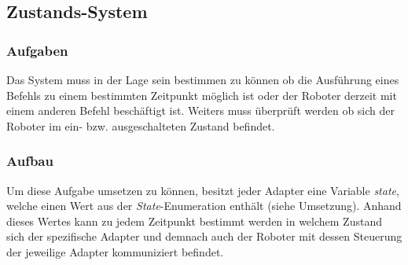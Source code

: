 
\subsection{Zustands-System}

\subsubsection{Aufgaben}
Das System muss in der Lage sein bestimmen zu können ob die Ausführung eines Befehls zu einem bestimmten Zeitpunkt möglich ist oder der Roboter derzeit mit einem anderen Befehl beschäftigt ist. Weiters muss überprüft werden ob sich der Roboter im ein- bzw. ausgeschalteten Zustand befindet.

\subsubsection{Aufbau}
Um diese Aufgabe umsetzen zu können, besitzt jeder Adapter eine Variable \textit{state}, welche einen Wert aus der \textit{State}-Enumeration enthält (siehe Umsetzung). Anhand dieses Wertes kann zu jedem Zeitpunkt bestimmt werden in welchem Zustand sich der spezifische Adapter und demnach auch der Roboter mit dessen Steuerung der jeweilige Adapter kommuniziert befindet.

